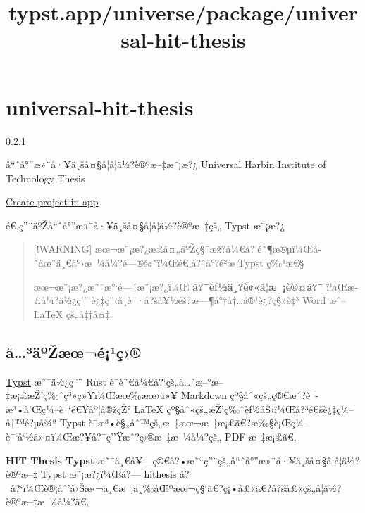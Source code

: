 \title{typst.app/universe/package/universal-hit-thesis}

\label{banner}
\label{template-thumbnail}

\section{universal-hit-thesis}\label{universal-hit-thesis}

{ 0.2.1 }

å``ˆå°''æ»¨å·¥ä¸šå¤§å­¦å­¦ä½?è®ºæ--‡æ¨¡æ?¿ \textbar{} Universal Harbin
Institute of Technology Thesis

\href{/app?template=universal-hit-thesis&version=0.2.1}{Create project
in app}

\label{readme}
é€‚ç''¨äºŽå``ˆå°''æ»¨å·¥ä¸šå¤§å­¦å­¦ä½?è®ºæ--‡çš„ Typst æ¨¡æ?¿


\begin{quote}
{[}!WARNING{]}
æœ¬æ¨¡æ?¿æ­£å¤„äºŽç§¯æž?å¼€å?{}`é˜¶æ®µï¼Œå­˜åœ¨ä¸€äº›æ~¼å¼?é---®é¢˜ï¼Œé€‚å?ˆå°?é²œ
Typst ç‰¹æ€§

æœ¬æ¨¡æ?¿æ˜¯æ°`é---´æ¨¡æ?¿ï¼Œ \textbf{å?¯èƒ½ä¸?è¢«å­¦æ~¡è®¤å?¯}
ï¼Œæ­£å¼?ä½¿ç''¨è¿‡ç¨‹ä¸­è¯·å?šå¥½éš?æ---¶å°†å†\ldots å®¹è¿?ç§»è‡³ Word
æˆ-- LaTeX çš„å‡†å¤‡
\end{quote}

\subsection{å\ldots³äºŽæœ¬é¡¹ç›®}\label{uxe5uxb3uxe4uxbaux17euxe6ux153uxe9uxb9uxe7}

\href{https://typst.app/}{Typst} æ˜¯ä½¿ç''¨ Rust
è¯­è¨€å¼€å?{}`çš„å\ldots¨æ--°æ--‡æ¡£æŽ'ç‰ˆç³»ç»Ÿï¼Œæœ‰æœ›ä»¥ Markdown
çº§åˆ«çš„ç®€æ´?è¯­æ³•å'Œç¼--è¯`é€Ÿåº¦å®žçŽ° LaTeX
çº§åˆ«çš„æŽ'ç‰ˆèƒ½åŠ›ï¼Œå?³é€šè¿‡ç¼--å†™é?µå¾ª Typst
è¯­æ³•è§„åˆ™çš„æ--‡æœ¬æ--‡æ¡£ã€?æ‰§è¡Œç¼--è¯`å`½ä»¤ï¼Œæ?¥å?¯ç''Ÿæˆ?ç›®æ~‡æ~¼å¼?çš„
PDF æ--‡æ¡£ã€‚

\textbf{HIT Thesis Typst}
æ˜¯ä¸€å¥---ç®€å?•æ˜``ç''¨çš„å``ˆå°''æ»¨å·¥ä¸šå¤§å­¦å­¦ä½?è®ºæ--‡ Typst
æ¨¡æ?¿ï¼Œå?--- \href{https://github.com/hithesis/hithesis}{hithesis}
å?¯å?{}`ï¼Œè®¡åˆ'å›Šæ‹¬ä¸€æ~¡ä¸‰åŒºæœ¬ç§`ã€?ç¡•å£«ã€?å?šå£«çš„å­¦ä½?è®ºæ--‡æ~¼å¼?ã€‚

